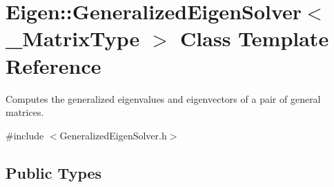 \hypertarget{class_eigen_1_1_generalized_eigen_solver}{}\section{Eigen\+::Generalized\+Eigen\+Solver$<$ \+\_\+\+Matrix\+Type $>$ Class Template Reference}
\label{class_eigen_1_1_generalized_eigen_solver}


Computes the generalized eigenvalues and eigenvectors of a pair of general matrices.  




{\ttfamily \#include $<$Generalized\+Eigen\+Solver.\+h$>$}

\subsection*{Public Types}
